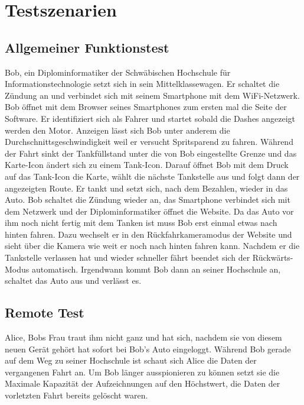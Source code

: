\documentclass[pflichtenheft.tex]{subfiles}
\begin{document}
\chapter{Testszenarien}
\section{Allgemeiner Funktionstest}
Bob, ein Diplominformatiker der Schwäbischen Hochschule für Informationstechnologie setzt sich in sein Mittelklassewagen. Er schaltet die Zündung an und verbindet sich mit seinem Smartphone mit dem WiFi-Netzwerk. Bob öffnet mit dem Browser seines Smartphones zum ersten mal die Seite der Software. Er identifiziert sich als Fahrer und startet sobald die Dashes angezeigt werden den Motor. Anzeigen lässt sich Bob unter anderem die Durchschnittsgeschwindigkeit weil er versucht Spritsparend zu fahren. Während der Fahrt sinkt der Tankfüllstand unter die von Bob eingestellte Grenze und das Karte-Icon ändert sich zu einem Tank-Icon. Darauf öffnet Bob mit dem Druck auf das Tank-Icon die Karte, wählt die nächste Tankstelle aus und folgt dann der angezeigten Route. Er tankt  und setzt sich, nach dem Bezahlen, wieder in das Auto. Bob schaltet die Zündung wieder an, das Smartphone verbindet sich mit dem Netzwerk und der Diplominformatiker öffnet die Website. Da das Auto vor ihm noch nicht fertig mit dem Tanken ist muss Bob erst einmal etwas nach hinten fahren. Dazu wechselt er in den Rückfahrkameramodus der Website und sieht über die Kamera wie weit er noch nach hinten fahren kann. Nachdem er die Tankstelle verlassen hat und wieder schneller fährt beendet sich der Rückwärts-Modus automatisch. Irgendwann kommt Bob dann an seiner Hochschule an, schaltet das Auto aus und verlässt es.

\section{Remote Test}
Alice, Bobs Frau traut ihm nicht ganz und hat sich, nachdem sie von diesem neuen Gerät gehört hat sofort bei Bob's Auto eingeloggt. Während Bob gerade auf dem Weg zu seiner Hochschule ist schaut sich Alice die Daten der vergangenen Fahrt an. Um Bob länger ausspionieren zu können setzt sie die Maximale Kapazität der Aufzeichnungen auf den Höchstwert, die Daten der vorletzten Fahrt bereits gelöscht waren.
\end{document}
